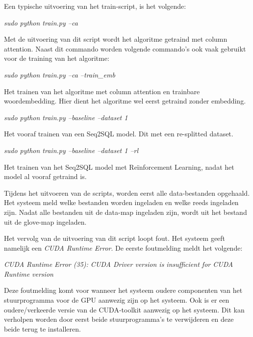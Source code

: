 Een typische uitvoering van het train-script, is het volgende:

\begin{center}
	\textit{sudo python train.py --ca}
\end{center}

Met de uitvoering van dit script wordt het algoritme getraind met column attention. Naast dit commando worden volgende commando's ook vaak gebruikt voor de training van het algoritme:

\begin{center}
	\textit{sudo python train.py --ca --train\_emb}
\end{center}

Het trainen van het algoritme met column attention en trainbare woordembedding. Hier dient het algoritme wel eerst getraind zonder embedding.

\begin{center}
	\textit{sudo python train.py --baseline --dataset 1}
\end{center}

Het vooraf trainen van een Seq2SQL model. Dit met een re-splitted dataset. 

\begin{center}
	\textit{sudo python train.py --baseline --dataset 1 --rl}
\end{center}

Het trainen van het Seq2SQL model met Reïnforcement Learning, nadat het model al vooraf getraind is.

Tijdens het uitvoeren van de scripts, worden eerst alle data-bestanden opgehaald. Het systeem meld welke bestanden worden ingeladen en welke reeds ingeladen zijn. Nadat alle bestanden uit de data-map ingeladen zijn, wordt uit het bestand uit de glove-map ingeladen. 

Het vervolg van de uitvoering van dit script loopt fout. Het systeem geeft namelijk een \textit{CUDA Runtime Error}. De eerste foutmelding meldt het volgende:

\begin{center}
	\textit{CUDA Runtime Error (35): CUDA Driver version is insufficient for CUDA Runtime version}
\end{center}

Deze foutmelding komt voor wanneer het systeem oudere componenten van het stuurprogramma voor de GPU aanwezig zijn op het systeem. Ook is er een oudere/verkeerde versie van de CUDA-toolkit aanwezig op het systeem. Dit kan verholpen worden door eerst beide stuurprogramma's te verwijderen en deze beide terug te installeren.


